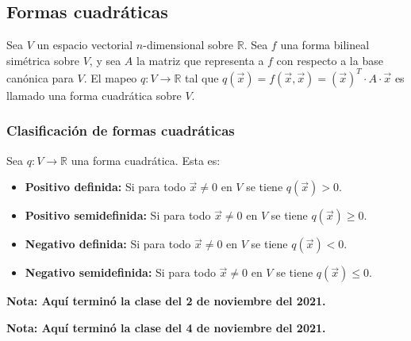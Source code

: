 \documentclass{article}
\begin{document}
\subsection*{Formas cuadráticas}

Sea $V$ un espacio vectorial $n$-dimensional sobre $\mathbb{R}$. Sea $f$ una forma bilineal simétrica sobre $V$, y sea $A$ la matriz que representa a $f$ con respecto a la base canónica para $V$. El mapeo $q:V\to\mathbb{R}$ tal que $q(\vec{x})=f(\vec{x},\vec{x})=(\vec{x})^T\cdot A\cdot \vec{x}$ es llamado una forma cuadrática sobre $V$.

\subsubsection*{Clasificación de formas cuadráticas}

Sea $q:V\to\mathbb{R}$ una forma cuadrática. Esta es:

\begin{itemize}

\item \textbf{Positivo definida:} Si para todo $\vec{x}\neq 0$ en $V$ se tiene $q(\vec{x})>0$.

\item \textbf{Positivo semidefinida:} Si para todo $\vec{x}\neq 0$ en $V$ se tiene $q(\vec{x})\geq 0$.

\item \textbf{Negativo definida:} Si para todo $\vec{x}\neq 0$ en $V$ se tiene $q(\vec{x})<0$.

\item \textbf{Negativo semidefinida:} Si para todo $\vec{x}\neq 0$ en $V$ se tiene $q(\vec{x})\leq 0$.

\end{itemize}

\vspace{10pt}
\textbf{Nota: Aquí terminó la clase del 2 de noviembre del 2021.}




\vspace{10pt}
\textbf{Nota: Aquí terminó la clase del 4 de noviembre del 2021.}
\end{document}
